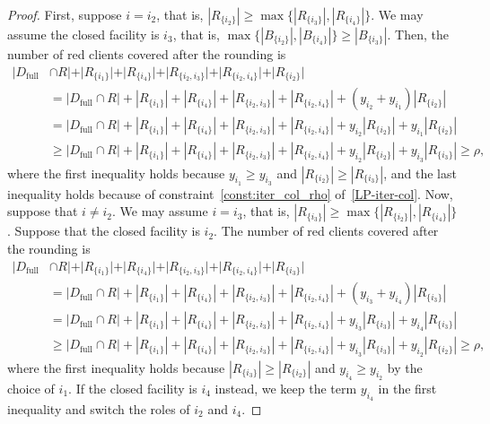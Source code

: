 \begin{proof}
First, suppose $i = i_2$, that is, $|R_{\{i_2\}}| \geq \max\{|R_{\{i_3\}}|,|R_{\{i_4\}}|\}$. We may assume the closed facility is $i_3$, that is, $\max\{|B_{\{i_2\}}|,|B_{\{i_4\}}|\} \geq |B_{\{i_3\}}|$. Then, the number of red clients covered after the rounding is
\begin{align*}
    |D_\text{full} & \cap R| + |R_{\{i_1\}}| + |R_{\{i_4\}}| + |R_{\{i_2,i_3\}}| + |R_{\{i_2,i_4\}}| + |R_{\{i_2\}}| \\
    &=|D_\text{full} \cap R| + |R_{\{i_1\}}| + |R_{\{i_4\}}| + |R_{\{i_2,i_3\}}| + |R_{\{i_2,i_4\}}| + (y_{i_2} + y_{i_1}) |R_{\{i_2\}}| \\
    &=|D_\text{full} \cap R| + |R_{\{i_1\}}| + |R_{\{i_4\}}| + |R_{\{i_2,i_3\}}| + |R_{\{i_2,i_4\}}| + y_{i_2}|R_{\{i_2\}}| + y_{i_1} |R_{\{i_2\}}|\\
    &\geq|D_\text{full} \cap R| + |R_{\{i_1\}}| + |R_{\{i_4\}}| + |R_{\{i_2,i_3\}}| + |R_{\{i_2,i_4\}}| + y_{i_2}|R_{\{i_2\}}| + y_{i_3} |R_{\{i_3\}}| \geq \rho,
\end{align*}
where the first inequality holds because $y_{i_1} \geq y_{i_3}$ and $|R_{\{i_2\}}| \geq |R_{\{i_3\}}|$, and the last inequality holds because of constraint~\eqref{const:iter_col_rho} of~\eqref{LP-iter-col}. Now, suppose that $i \neq i_2$. We may assume $i = i_3$, that is, $|R_{\{i_3\}}| \geq \max\{|R_{\{i_2\}}|,|R_{\{i_4\}}|\}$. Suppose that the closed facility is $i_2$. The number of red clients covered after the rounding is
\begin{align*}
    |D_\text{full} & \cap R| + |R_{\{i_1\}}| + |R_{\{i_4\}}| + |R_{\{i_2,i_3\}}| + |R_{\{i_2,i_4\}}| + |R_{\{i_3\}}| \\
    &=|D_\text{full} \cap R| + |R_{\{i_1\}}| + |R_{\{i_4\}}| + |R_{\{i_2,i_3\}}| + |R_{\{i_2,i_4\}}| + (y_{i_3} + y_{i_4}) |R_{\{i_3\}}| \\
    &=|D_\text{full} \cap R| + |R_{\{i_1\}}| + |R_{\{i_4\}}| + |R_{\{i_2,i_3\}}| + |R_{\{i_2,i_4\}}| + y_{i_3}|R_{\{i_3\}}| + y_{i_4} |R_{\{i_3\}}|\\
    &\geq|D_\text{full} \cap R| + |R_{\{i_1\}}| + |R_{\{i_4\}}| + |R_{\{i_2,i_3\}}| + |R_{\{i_2,i_4\}}| + y_{i_3}|R_{\{i_3\}}| + y_{i_2} |R_{\{i_2\}}| \geq \rho,
\end{align*}
where the first inequality holds because $|R_{\{i_3\}}| \geq |R_{\{i_2\}}|$ and $y_{i_4} \geq y_{i_2}$ by the choice of $i_1$. If the closed facility is $i_4$ instead, we keep the term $y_{i_4}$ in the first inequality and switch the roles of $i_2$ and $i_4$.
\end{proof}

